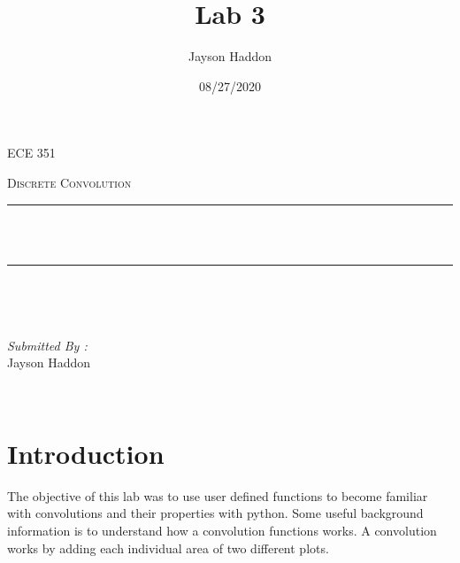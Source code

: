\documentclass[11pt,a4]{report}
\title{Lab 3}
\author{Jayson Haddon}
\date{08/27/2020}
\makeatletter
\let\thetitle\@title
\makeatother
\begin{document}

\begin{titlepage}
	\centering
    \vspace*{0.5 cm}
\begin{center}    \textsc{\Large   ECE 351 }\\[2.0 cm]	\end{center}%
	\textsc{\Large Discrete Convolution  }\\[0.5 cm]				%
	\rule{\linewidth}{0.2 mm} \\[0.4 cm]
	{ \huge \bfseries \thetitle}\\
	\rule{\linewidth}{0.2 mm} \\[1.5 cm]
	
	\begin{minipage}{0.4\textwidth}
		\begin{flushleft} \large
			\end{flushleft}
			\end{minipage}~
			\begin{minipage}{0.4\textwidth}
            
			\begin{flushright} \large
			\emph{Submitted By :} \\
			Jayson Haddon  
		\end{flushright}
           
	\end{minipage}\\[2 cm]
	
    
    
    
    
	
\end{titlepage}

\tableofcontents
\pagebreak

\renewcommand{\thesection}{\arabic{section}}
\section{Introduction}
The objective of this lab was to use user defined functions to become familiar with convolutions and their properties with python. Some useful background information is to understand how a convolution functions works. A convolution works by adding each individual area of two different plots. 
\end{document}
